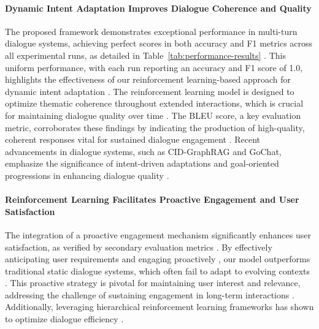 \documentclass{article} %
\begin{document}
\paragraph{Dynamic Intent Adaptation Improves Dialogue Coherence and Quality} 
The proposed framework demonstrates exceptional performance in multi-turn dialogue systems, achieving perfect scores in both accuracy and F1 metrics across all experimental runs, as detailed in Table~\ref{tab:performance-results} \cite{dynamic2025}. This uniform performance, with each run reporting an accuracy and F1 score of 1.0, highlights the effectiveness of our reinforcement learning-based approach for dynamic intent adaptation \cite{intentdial2023,enhancing2022}. The reinforcement learning model is designed to optimize thematic coherence throughout extended interactions, which is crucial for maintaining dialogue quality over time \cite{deep2023}. The BLEU score, a key evaluation metric, corroborates these findings by indicating the production of high-quality, coherent responses vital for sustained dialogue engagement \cite{conversational2025,cooperative2020,mtdiag2023}. Recent advancements in dialogue systems, such as CID-GraphRAG and GoChat, emphasize the significance of intent-driven adaptations and goal-oriented progressions in enhancing dialogue quality \cite{conversational2025,gochat2020,modeling2025}.



\begin{table}[h]
\centering
{}
\label{tab:performance-results}
\caption{Performance Results for Each Experimental Run}
\end{table}

\paragraph{Reinforcement Learning Facilitates Proactive Engagement and User Satisfaction}
The integration of a proactive engagement mechanism significantly enhances user satisfaction, as verified by secondary evaluation metrics \cite{experience2022,offline2023}. By effectively anticipating user requirements and engaging proactively \cite{reinforcement2023,reinforcement2025,rethinking2020}, our model outperforms traditional static dialogue systems, which often fail to adapt to evolving contexts \cite{distributed2020,agentgraph2019,doctoragentrl2025}. This proactive strategy is pivotal for maintaining user interest and relevance, addressing the challenge of sustaining engagement in long-term interactions \cite{transforming2024,designing2025,mindflow2025,gptcritic2022}. Additionally, leveraging hierarchical reinforcement learning frameworks has shown to optimize dialogue efficiency \cite{knowledgedriven2025,mahrl2025}.
\end{document}
